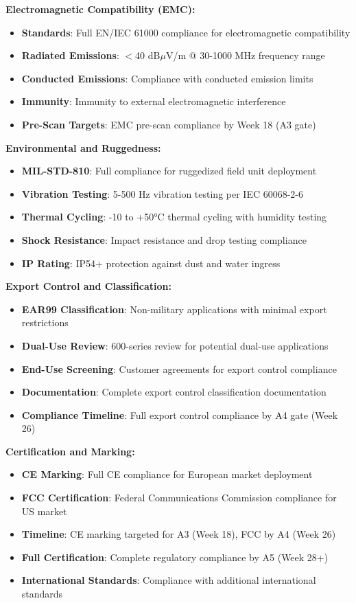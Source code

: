 \documentclass[11pt,a4paper]{article}
\begin{document}
\textbf{Electromagnetic Compatibility (EMC):}
\begin{itemize}
\item \textbf{Standards}: Full EN/IEC 61000 compliance for electromagnetic compatibility
\item \textbf{Radiated Emissions}: $<$40 dB$\mu$V/m @ 30-1000 MHz frequency range
\item \textbf{Conducted Emissions}: Compliance with conducted emission limits
\item \textbf{Immunity}: Immunity to external electromagnetic interference
\item \textbf{Pre-Scan Targets}: EMC pre-scan compliance by Week 18 (A3 gate)
\end{itemize}

\textbf{Environmental and Ruggedness:}
\begin{itemize}
\item \textbf{MIL-STD-810}: Full compliance for ruggedized field unit deployment
\item \textbf{Vibration Testing}: 5-500 Hz vibration testing per IEC 60068-2-6
\item \textbf{Thermal Cycling}: -10 to +50°C thermal cycling with humidity testing
\item \textbf{Shock Resistance}: Impact resistance and drop testing compliance
\item \textbf{IP Rating}: IP54+ protection against dust and water ingress
\end{itemize}

\textbf{Export Control and Classification:}
\begin{itemize}
\item \textbf{EAR99 Classification}: Non-military applications with minimal export restrictions
\item \textbf{Dual-Use Review}: 600-series review for potential dual-use applications
\item \textbf{End-Use Screening}: Customer agreements for export control compliance
\item \textbf{Documentation}: Complete export control classification documentation
\item \textbf{Compliance Timeline}: Full export control compliance by A4 gate (Week 26)
\end{itemize}

\textbf{Certification and Marking:}
\begin{itemize}
\item \textbf{CE Marking}: Full CE compliance for European market deployment
\item \textbf{FCC Certification}: Federal Communications Commission compliance for US market
\item \textbf{Timeline}: CE marking targeted for A3 (Week 18), FCC by A4 (Week 26)
\item \textbf{Full Certification}: Complete regulatory compliance by A5 (Week 28+)
\item \textbf{International Standards}: Compliance with additional international standards
\end{itemize}
\end{document}
